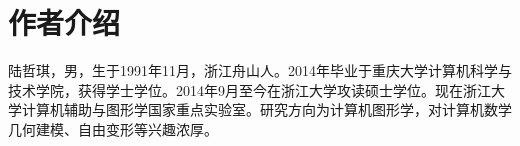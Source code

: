 \chapter{作者介绍}
陆哲琪，男，生于1991年11月，浙江舟山人。2014年毕业于重庆大学计算机科学与技术学院，获得学士学位。2014年9月至今在浙江大学攻读硕士学位。现在浙江大学计算机辅助与图形学国家重点实验室。研究方向为计算机图形学，对计算机数学几何建模、自由变形等兴趣浓厚。
